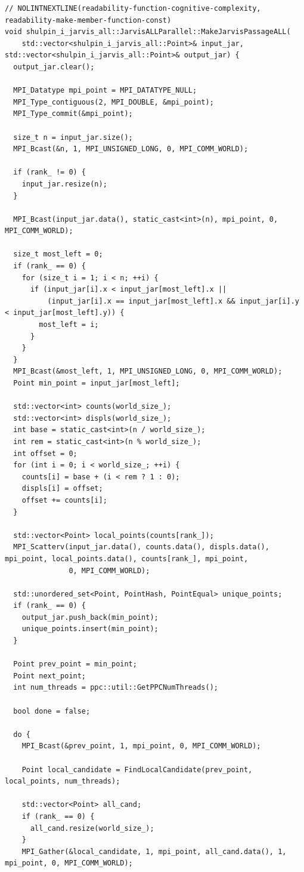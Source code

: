 \documentclass[12pt,a4paper]{article}
\begin{document}
\begin{lstlisting}[caption={Гибридная версия алгоритма(MPI+STL)}]
// NOLINTNEXTLINE(readability-function-cognitive-complexity, readability-make-member-function-const)
void shulpin_i_jarvis_all::JarvisALLParallel::MakeJarvisPassageALL(
    std::vector<shulpin_i_jarvis_all::Point>& input_jar, std::vector<shulpin_i_jarvis_all::Point>& output_jar) {
  output_jar.clear();

  MPI_Datatype mpi_point = MPI_DATATYPE_NULL;
  MPI_Type_contiguous(2, MPI_DOUBLE, &mpi_point);
  MPI_Type_commit(&mpi_point);

  size_t n = input_jar.size();
  MPI_Bcast(&n, 1, MPI_UNSIGNED_LONG, 0, MPI_COMM_WORLD);

  if (rank_ != 0) {
    input_jar.resize(n);
  }

  MPI_Bcast(input_jar.data(), static_cast<int>(n), mpi_point, 0, MPI_COMM_WORLD);

  size_t most_left = 0;
  if (rank_ == 0) {
    for (size_t i = 1; i < n; ++i) {
      if (input_jar[i].x < input_jar[most_left].x ||
          (input_jar[i].x == input_jar[most_left].x && input_jar[i].y < input_jar[most_left].y)) {
        most_left = i;
      }
    }
  }
  MPI_Bcast(&most_left, 1, MPI_UNSIGNED_LONG, 0, MPI_COMM_WORLD);
  Point min_point = input_jar[most_left];

  std::vector<int> counts(world_size_);
  std::vector<int> displs(world_size_);
  int base = static_cast<int>(n / world_size_);
  int rem = static_cast<int>(n % world_size_);
  int offset = 0;
  for (int i = 0; i < world_size_; ++i) {
    counts[i] = base + (i < rem ? 1 : 0);
    displs[i] = offset;
    offset += counts[i];
  }

  std::vector<Point> local_points(counts[rank_]);
  MPI_Scatterv(input_jar.data(), counts.data(), displs.data(), mpi_point, local_points.data(), counts[rank_], mpi_point,
               0, MPI_COMM_WORLD);

  std::unordered_set<Point, PointHash, PointEqual> unique_points;
  if (rank_ == 0) {
    output_jar.push_back(min_point);
    unique_points.insert(min_point);
  }

  Point prev_point = min_point;
  Point next_point;
  int num_threads = ppc::util::GetPPCNumThreads();

  bool done = false;

  do {
    MPI_Bcast(&prev_point, 1, mpi_point, 0, MPI_COMM_WORLD);

    Point local_candidate = FindLocalCandidate(prev_point, local_points, num_threads);

    std::vector<Point> all_cand;
    if (rank_ == 0) {
      all_cand.resize(world_size_);
    }
    MPI_Gather(&local_candidate, 1, mpi_point, all_cand.data(), 1, mpi_point, 0, MPI_COMM_WORLD);


\end{lstlisting}
\end{document}
